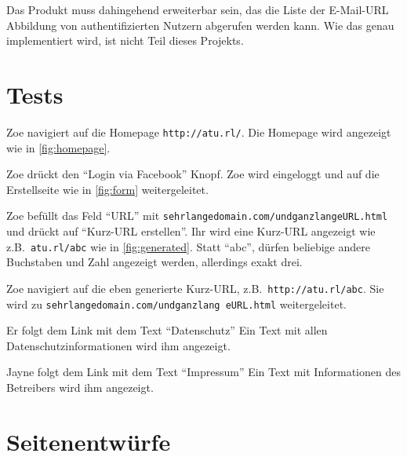 \documentclass[parskip=full,11pt,twoside]{scrartcl}
\begin{document}
Das Produkt muss dahingehend erweiterbar sein,
das die Liste der E-Mail-URL Abbildung von authentifizierten Nutzern
abgerufen werden kann.
Wie das genau implementiert wird, ist nicht Teil dieses Projekts.

\section{Tests}


{Zoe navigiert auf die Homepage \texttt{http://atu.rl/}.}
{Die Homepage wird angezeigt wie in \cref{fig:homepage}.}

%
{Zoe drückt den \enquote{Login via Facebook} Knopf.}%
{Zoe wird eingeloggt und auf die Erstellseite wie in \cref{fig:form} weitergeleitet.}

\teststepnostate
{Zoe befüllt das Feld \enquote{URL} mit \texttt{sehrlangedomain.com/undganzlangeURL.html} und drückt auf \enquote{Kurz-URL erstellen}.}%
{Ihr wird eine Kurz-URL angezeigt wie z.B.\ \texttt{atu.rl/abc}
 wie in \cref{fig:generated}.
 Statt \enquote{abc}, dürfen beliebige andere Buchstaben und Zahl angezeigt werden, allerdings exakt drei.}

\teststepnostate
{Zoe navigiert auf die eben generierte Kurz-URL, z.B.\ \texttt{http://atu.rl/abc}.}
{Sie wird zu \texttt{sehrlangedomain.com/undganzlang  eURL.html} weitergeleitet.}


{Er folgt dem Link mit dem Text \enquote{Datenschutz}}
{Ein Text mit allen Datenschutzinformationen wird ihm angezeigt.}

\teststepnostate
{Jayne folgt dem Link mit dem Text \enquote{Impressum}}
{Ein Text mit Informationen des Betreibers wird ihm angezeigt.}

\pagebreak
\appendix

\section{Seitenentwürfe}

\end{document}
